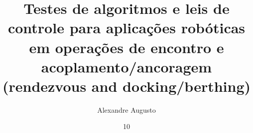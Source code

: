 \documentclass[msc]{ita}    %
\author{Alexandre Augusto}{Santana de Oliveira}
\title{Testes de algoritmos e leis de controle para aplicações robóticas em operações de encontro e acoplamento/ancoragem (rendezvous and docking/berthing)}
\date{10}{fevereiro}{2025}
\begin{document}


\mainmatter















% 



\renewcommand\bibname{\itareferencesnamebabel}
\printbibliography

\appendix


\newpage


\newpage


\newpage


\newpage


\newpage

% 

\printglossaries
\end{document}
